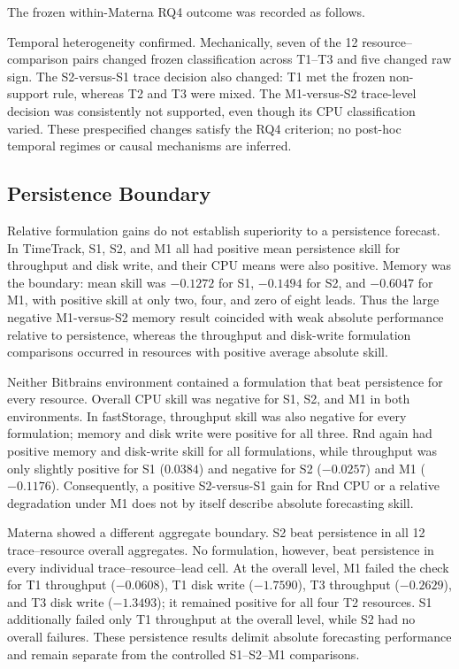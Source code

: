 \documentclass[a4paper,fleqn]{cas-dc}
\begin{document}
The frozen within-Materna RQ4 outcome was recorded as follows.

\noindent Temporal heterogeneity confirmed. Mechanically, seven of the 12
resource--comparison pairs changed frozen classification across T1--T3 and
five changed raw sign. The S2-versus-S1 trace decision also changed: T1 met the
frozen non-support rule, whereas T2 and T3 were mixed. The M1-versus-S2
trace-level decision was consistently not supported, even though its CPU
classification varied. These prespecified changes satisfy the RQ4 criterion;
no post-hoc temporal regimes or causal mechanisms are inferred.

\subsection{Persistence Boundary}
\label{sec:results-persistence}

Relative formulation gains do not establish superiority to a persistence
forecast. In TimeTrack, S1, S2, and M1 all had positive mean persistence skill
for throughput and disk write, and their CPU means were also positive. Memory
was the boundary: mean skill was $-0.1272$ for S1, $-0.1494$ for S2, and
$-0.6047$ for M1, with positive skill at only two, four, and zero of eight
leads. Thus the large negative M1-versus-S2 memory result coincided with weak
absolute performance relative to persistence, whereas the throughput and
disk-write formulation comparisons occurred in resources with positive
average absolute skill.

Neither Bitbrains environment contained a formulation that beat persistence
for every resource. Overall CPU skill was negative for S1, S2, and M1 in both
environments. In fastStorage, throughput skill was also negative for every
formulation; memory and disk write were positive for all three. Rnd again had
positive memory and disk-write skill for all formulations, while throughput
was only slightly positive for S1 ($0.0384$) and negative for S2 ($-0.0257$)
and M1 ($-0.1176$). Consequently, a positive S2-versus-S1 gain for Rnd CPU or a
relative degradation under M1 does not by itself describe absolute forecasting
skill.

Materna showed a different aggregate boundary. S2 beat persistence in all 12
trace--resource overall aggregates. No formulation, however, beat persistence
in every individual trace--resource--lead cell. At the overall level, M1 failed
the check for T1 throughput ($-0.0608$), T1 disk write ($-1.7590$), T3
throughput ($-0.2629$), and T3 disk write ($-1.3493$); it remained positive for
all four T2 resources. S1 additionally failed only T1 throughput at the overall
level, while S2 had no overall failures. These persistence results delimit
absolute forecasting performance and remain separate from the controlled
S1--S2--M1 comparisons.
\end{document}
